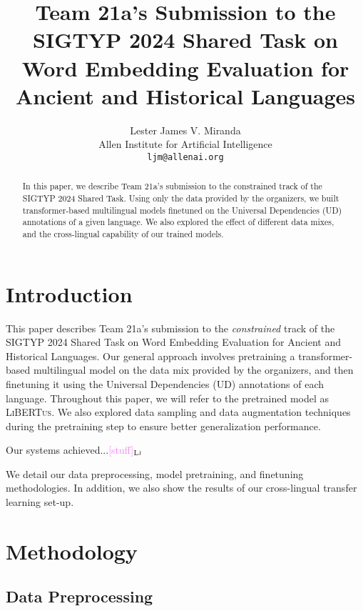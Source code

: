 \documentclass[11pt]{article}
\title{Team 21a's Submission to the SIGTYP 2024 Shared Task on Word Embedding Evaluation for Ancient and Historical Languages}
\author{Lester James V. Miranda \\
  Allen Institute for Artificial Intelligence \\
  \texttt{ljm@allenai.org} \\
}
\newcommand{\draftonly}[1]{#1}
\newcommand{\draftcomment}[3]{\draftonly{\textcolor{#2}{[#3]{$_{\textsc{#1}}$}}}}
\newcommand{\lj}[1]{\draftcomment{Lj}{violet}{#1}}
\newcommand{\libertus}{\textsc{LiBERTus}}
\begin{document}
\maketitle

\begin{abstract}
In this paper, we describe Team 21a's submission to the constrained track of the SIGTYP 2024 Shared Task.
Using only the data provided by the organizers, we built transformer-based multilingual models finetuned on the Universal Dependencies (UD) annotations of a given language.
We also explored the effect of different data mixes, and the cross-lingual capability of our trained models.
\end{abstract}

\section{Introduction}
This paper describes Team 21a's submission to the \textit{constrained} track of the SIGTYP 2024 Shared Task on Word Embedding Evaluation for Ancient and Historical Languages.
Our general approach involves pretraining a transformer-based multilingual model on the data mix provided by the organizers, and then finetuning it using the Universal Dependencies (UD) annotations of each language.
Throughout this paper, we will refer to the pretrained model as \libertus{}.
We also explored data sampling and data augmentation techniques during the pretraining step to ensure better generalization performance.

Our systems achieved...\lj{stuff}

We detail our data preprocessing, model pretraining, and finetuning methodologies.
In addition, we also show the results of our cross-lingual transfer learning set-up.

\section{Methodology}






\subsection{Data Preprocessing}
\end{document}

